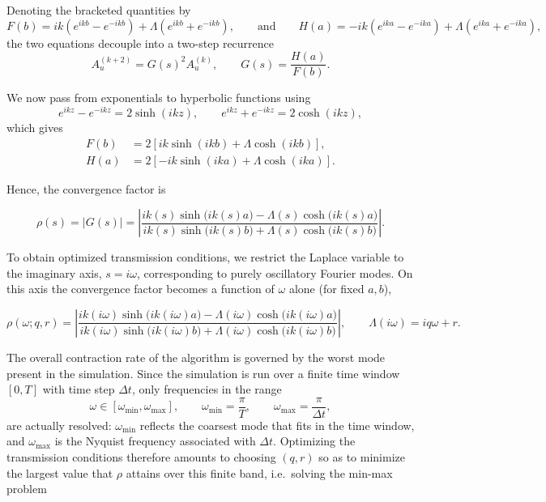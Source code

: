\documentclass{Configuration_Files/PoliMi3i_thesis}
\begin{document}
Denoting the bracketed quantities by
\[
F(b) = ik\left(e^{ikb}-e^{-ikb}\right)+\Lambda\left(e^{ikb}+e^{-ikb}\right),
\qquad \text{and} \qquad
H(a) = -ik\left(e^{ika}-e^{-ika}\right)+\Lambda\left(e^{ika}+e^{-ika}\right),
\]
the two equations decouple into a two-step recurrence
\begin{equation*}
A_u^{(k+2)} = G(s)^2 A_u^{(k)},
\qquad
G(s) = \frac{H(a)}{F(b)}.
\end{equation*}

We now pass from exponentials to hyperbolic functions using
\[
e^{ikz}-e^{-ikz}=2\sinh(ikz),
\qquad
e^{ikz}+e^{-ikz}=2\cosh(ikz),
\]
which gives
\begin{align*}
F(b) &= 2\left[ik\sinh(ikb)+\Lambda\cosh(ikb)\right], \\
H(a) &= 2\left[-ik\sinh(ika)+\Lambda\cosh(ika)\right].
\end{align*}

Hence, the convergence factor is

\begin{equation*}
\rho(s)
=
|G(s)|
=
\left|
\frac{
ik(s)\sinh\bigl(ik(s)a\bigr)
-
\Lambda(s)\cosh\bigl(ik(s)a\bigr)
}{
ik(s)\sinh\bigl(ik(s)b\bigr)
+
\Lambda(s)\cosh\bigl(ik(s)b\bigr)
}
\right|.
\end{equation*}

To obtain optimized transmission conditions, we restrict the Laplace
variable to the imaginary axis, $s=i\omega$, corresponding to purely
oscillatory Fourier modes. On this axis the convergence factor becomes a
function of $\omega$ alone (for fixed $a,b$),

\begin{equation*}
\rho(\omega;q,r)
=
\left|
\frac{
ik(i\omega)\sinh\bigl(ik(i\omega)a\bigr)
-
\Lambda(i\omega)\cosh\bigl(ik(i\omega)a\bigr)
}{
ik(i\omega)\sinh\bigl(ik(i\omega)b\bigr)
+
\Lambda(i\omega)\cosh\bigl(ik(i\omega)b\bigr)
}
\right|,
\qquad
\Lambda(i\omega)=iq\omega+r.
\end{equation*}

The overall contraction rate of the algorithm is governed by the worst mode present in the simulation. Since the simulation is run over a finite time window $[0,T]$ with time step $\Delta t$, only frequencies in the range
\[
\omega\in[\omega_{\min},\omega_{\max}],
\qquad
\omega_{\min}=\frac{\pi}{T},
\qquad
\omega_{\max}=\frac{\pi}{\Delta t},
\]
are actually resolved: $\omega_{\min}$ reflects the coarsest mode that fits in the time window, and $\omega_{\max}$ is the Nyquist frequency associated with $\Delta t$. Optimizing the transmission conditions therefore amounts to choosing $(q,r)$ so as to minimize the largest value that $\rho$ attains over this finite band, i.e.\ solving the min-max problem
\end{document}
